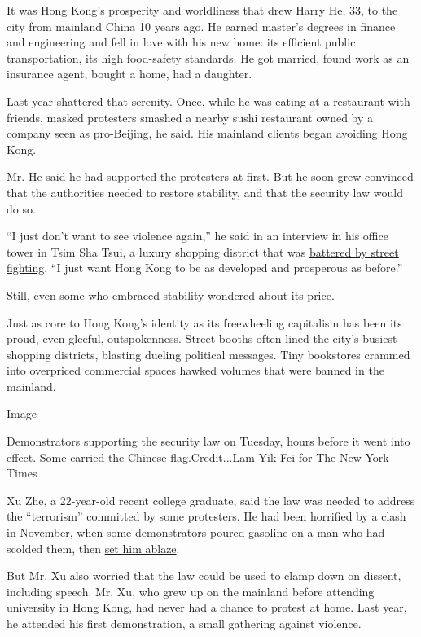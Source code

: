 It was Hong Kong's prosperity and worldliness that drew Harry He, 33, to
the city from mainland China 10 years ago. He earned master's degrees in
finance and engineering and fell in love with his new home: its
efficient public transportation, its high food-safety standards. He got
married, found work as an insurance agent, bought a home, had a
daughter.

Last year shattered that serenity. Once, while he was eating at a
restaurant with friends, masked protesters smashed a nearby sushi
restaurant owned by a company seen as pro-Beijing, he said. His mainland
clients began avoiding Hong Kong.

Mr. He said he had supported the protesters at first. But he soon grew
convinced that the authorities needed to restore stability, and that the
security law would do so.

``I just don't want to see violence again,'' he said in an interview in
his office tower in Tsim Sha Tsui, a luxury shopping district that was
\href{https://www.scmp.com/news/hong-kong/politics/article/3038385/busy-hong-kong-tourist-district-dealing-destructive}{battered
by street fighting}. ``I just want Hong Kong to be as developed and
prosperous as before.''

Still, even some who embraced stability wondered about its price.

Just as core to Hong Kong's identity as its freewheeling capitalism has
been its proud, even gleeful, outspokenness. Street booths often lined
the city's busiest shopping districts, blasting dueling political
messages. Tiny bookstores crammed into overpriced commercial spaces
hawked volumes that were banned in the mainland.

Image

Demonstrators supporting the security law on Tuesday, hours before it
went into effect. Some carried the Chinese flag.Credit...Lam Yik Fei for
The New York Times

Xu Zhe, a 22-year-old recent college graduate, said the law was needed
to address the ``terrorism'' committed by some protesters. He had been
horrified by a clash in November, when some demonstrators poured
gasoline on a man who had scolded them, then
\href{https://www.nytimes3xbfgragh.onion/2019/11/11/world/hong-kong-protests.html}{set
him ablaze}.

But Mr. Xu also worried that the law could be used to clamp down on
dissent, including speech. Mr. Xu, who grew up on the mainland before
attending university in Hong Kong, had never had a chance to protest at
home. Last year, he attended his first demonstration, a small gathering
against violence.


